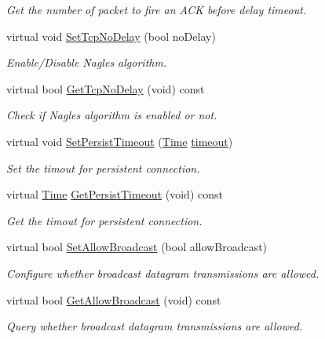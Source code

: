 \begin{DoxyCompactItemize}
\begin{DoxyCompactList}\small\item\em Get the number of packet to fire an A\+CK before delay timeout. \end{DoxyCompactList}\item 
virtual void \hyperlink{classns3_1_1TcpSocketBase_a5dc1ed5b7d5eacc77b0300229e1a0236}{Set\+Tcp\+No\+Delay} (bool no\+Delay)
\begin{DoxyCompactList}\small\item\em Enable/\+Disable Nagle\textquotesingle{}s algorithm. \end{DoxyCompactList}\item 
virtual bool \hyperlink{classns3_1_1TcpSocketBase_a40fe99d8e28d12ef478a346ae14c2fa9}{Get\+Tcp\+No\+Delay} (void) const 
\begin{DoxyCompactList}\small\item\em Check if Nagle\textquotesingle{}s algorithm is enabled or not. \end{DoxyCompactList}\item 
virtual void \hyperlink{classns3_1_1TcpSocketBase_a0d59156c8e210422800e31ef0037f00d}{Set\+Persist\+Timeout} (\hyperlink{classns3_1_1Time}{Time} \hyperlink{openflow-switch_8cc_a386d174ae121d1cfa279074b7e209714}{timeout})
\begin{DoxyCompactList}\small\item\em Set the timout for persistent connection. \end{DoxyCompactList}\item 
virtual \hyperlink{classns3_1_1Time}{Time} \hyperlink{classns3_1_1TcpSocketBase_a4fa916690fa28137b0bd7df6b69638d1}{Get\+Persist\+Timeout} (void) const 
\begin{DoxyCompactList}\small\item\em Get the timout for persistent connection. \end{DoxyCompactList}\item 
virtual bool \hyperlink{classns3_1_1TcpSocketBase_a7484f982e3a1d04d9ad0dd4ed6e3e004}{Set\+Allow\+Broadcast} (bool allow\+Broadcast)
\begin{DoxyCompactList}\small\item\em Configure whether broadcast datagram transmissions are allowed. \end{DoxyCompactList}\item 
virtual bool \hyperlink{classns3_1_1TcpSocketBase_abce73dedea2d3683df30ba77bf54fa40}{Get\+Allow\+Broadcast} (void) const 
\begin{DoxyCompactList}\small\item\em Query whether broadcast datagram transmissions are allowed. \end{DoxyCompactList}\item 

\end{DoxyCompactItemize}
